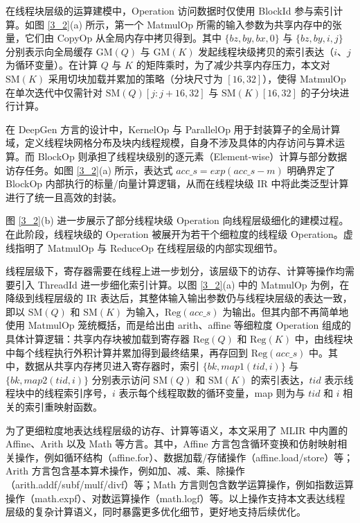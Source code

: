 在线程块层级的运算建模中，Operation 访问数据时仅使用 BlockId 参与索引计算。如图 \ref{3_2}(a) 所示，第一个 MatmulOp 所需的输入参数为共享内存中的张量，它们由 CopyOp 从全局内存中拷贝得到。其中 $\{bz, by, bx, 0\}$ 与 $\{bz, by, i, j\}$ 分别表示向全局缓存 $\mathrm{GM}(Q)$ 与 $\mathrm{GM}(K)$ 发起线程块级拷贝的索引表达（$i$、$j$ 为循环变量）。在计算 $Q$ 与 $K$ 的矩阵乘时，为了减少共享内存压力，本文对 $\mathrm{SM}(K)$ 采用切块加载并累加的策略（分块尺寸为 $[16, 32]$），使得 MatmulOp 在单次迭代中仅需针对 $\mathrm{SM}(Q)[j:j+16, 32]$ 与 $\mathrm{SM}(K)[16, 32]$ 的子分块进行计算。

在 DeepGen 方言的设计中，KernelOp 与 ParallelOp 用于封装算子的全局计算域，定义线程块网格分布及块内线程规模，自身不涉及具体的内存访问与算术运算。而 BlockOp 则承担了线程块级别的逐元素（Element-wise）计算与部分数据访存任务。如图 \ref{3_2}(a) 所示，表达式 $acc\_s = exp(acc\_s - m)$ 明确界定了 BlockOp 内部执行的标量/向量计算逻辑，从而在线程块级 IR 中将此类泛型计算进行了统一且高效的封装。

图 \ref{3_2}(b) 进一步展示了部分线程块级 Operation 向线程层级细化的建模过程。在此阶段，线程块级的 Operation 被展开为若干个细粒度的线程级 Operation。虚线指明了 MatmulOp 与 ReduceOp 在线程层级的内部实现细节。

线程层级下，寄存器需要在线程上进一步划分，该层级下的访存、计算等操作均需要引入 ThreadId 进一步细化索引计算。以图 \ref{3_2}(a) 中的 MatmulOp 为例，在降级到线程层级的 IR 表达后，其整体输入输出参数仍与线程块层级的表达一致，即以 $\mathrm{SM}(Q)$ 和 $\mathrm{SM}(K)$ 为输入，$\mathrm{Reg}(acc\_s)$ 为输出。但其内部不再简单地使用 MatmulOp 笼统概括，而是给出由 arith、affine 等细粒度 Operation 组成的具体计算逻辑：共享内存块被加载到寄存器 $\mathrm{Reg}(Q)$ 和 $\mathrm{Reg}(K)$ 中，由线程块中每个线程执行外积计算并累加得到最终结果，再存回到 $\mathrm{Reg}(acc\_s)$ 中。其中，数据从共享内存拷贝进入寄存器时，索引 $\{bk, map1(tid, i)\}$ 与 $\{bk, map2(tid, i)\}$ 分别表示访问 $\mathrm{SM}(Q)$ 和 $\mathrm{SM}(K)$ 的索引表达，$tid$ 表示线程块中的线程索引序号，$i$ 表示每个线程取数的循环变量，map 则为与 $tid$ 和 $i$ 相关的索引重映射函数。

为了更细粒度地表达线程层级的访存、计算等语义，本文采用了 MLIR 中内置的 Affine、Arith 以及 Math 等方言。其中，Affine 方言包含循环变换和仿射映射相关操作，例如循环结构（affine.for）、数据加载/存储操作（affine.load/store）等；Arith 方言包含基本算术操作，例如加、减、乘、除操作（arith.addf/subf/mulf/divf）等；Math 方言则包含数学运算操作，例如指数运算操作（math.expf）、对数运算操作（math.logf）等。以上操作支持本文表达线程层级的复杂计算语义，同时暴露更多优化细节，更好地支持后续优化。

